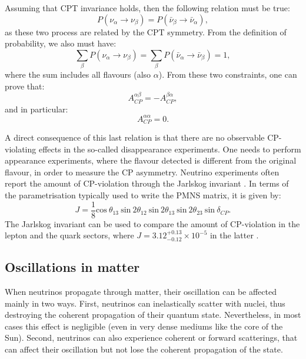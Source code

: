 Assuming that CPT invariance holds, then the following relation must be true:
\begin{equation}
	P(\nu_{\alpha} \rightarrow \nu_{\beta}) = P(\bar{\nu}_{\beta} \rightarrow \bar{\nu}_{\alpha}),
\end{equation}
as these two process are related by the CPT symmetry. From the definition of probability, we also must have:
\begin{equation}
	\sum_{\beta} P(\nu_{\alpha} \rightarrow \nu_{\beta}) = \sum_{\beta} P(\bar{\nu}_{\alpha} \rightarrow \bar{\nu}_{\beta}) = 1,
\end{equation}
where the sum includes all flavours (also $\alpha$). From these two constraints, one can prove that:
\begin{equation}
	A^{\alpha\beta}_{CP} = - A^{\beta\alpha}_{CP},
\end{equation}
and in particular:
\begin{equation}
	A^{\alpha\alpha}_{CP} = 0.
\end{equation}

A direct consequence of this last relation is that there are no observable CP-violating effects in the so-called disappearance experiments. One needs to perform appearance experiments, where the flavour detected is different from the original flavour, in order to measure the CP asymmetry. Neutrino experiments often report the amount of CP-violation through the Jarlskog invariant \cite{Jarlskog1985}. In terms of the parametrisation typically used to write the PMNS matrix, it is given by:
\begin{equation}
	J = \frac{1}{8} \mathrm{cos}~\theta_{13}~\mathrm{sin}~2\theta_{12}~\mathrm{sin}~2\theta_{13}~\mathrm{sin}~2\theta_{23}~\mathrm{sin}~\delta_{CP}.
\end{equation}
The Jarlskog invariant can be used to compare the amount of CP-violation in the lepton and the quark sectors, where $J=3.12^{+0.13}_{-0.12} \times 10^{-5}$ in the latter \cite{ParticleDataGroup2024}.

\subsection{Oscillations in matter}

When neutrinos propagate through matter, their oscillation can be affected mainly in two ways. First, neutrinos can inelastically scatter with nuclei, thus destroying the coherent propagation of their quantum state. Nevertheless, in most cases this effect is negligible (even in very dense mediums like the core of the Sun). Second, neutrinos can also experience coherent or forward scatterings, that can affect their oscillation but not lose the coherent propagation of the state.

